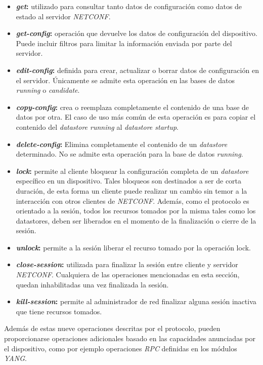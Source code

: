 \begin{itemize}
	\item \textbf{\textit{get}:} utilizado para consultar tanto datos de configuración como datos de estado al servidor \textit{NETCONF}.
	\item \textbf{\textit{get-config}:} operación que devuelve los datos de configuración del dispositivo. Puede incluir filtros para limitar la información enviada por parte del servidor.
	\item \textbf{\textit{edit-config}:} definida para crear, actualizar o borrar datos de configuración en el servidor. Únicamente se admite esta operación en las bases de datos \textit{running} o \textit{candidate}.
	\item \textbf{\textit{copy-config}:} crea o reemplaza completamente el contenido de una base de datos por otra. El caso de uso más común de esta operación es para copiar el contenido del \textit{datastore running} al \textit{datastore startup}. 
	\item \textbf{\textit{delete-config}:} Elimina completamente el contenido de un \textit{datastore} determinado. No se admite esta operación para la base de datos \textit{running}.
	\item \textbf{\textit{lock}:} permite al cliente bloquear la configuración completa de un \textit{datastore} específico en un dispositivo. Tales bloqueos son destinados a ser de corta duración, de esta forma un cliente puede realizar un cambio sin temor a la interacción con otros clientes de \textit{NETCONF}. Además, como el protocolo es orientado a la sesión, todos los recursos tomados por la misma tales como los datastores, deben ser liberados en el momento de la finalización o cierre de la sesión.
	\item \textbf{\textit{unlock}:} permite a la sesión liberar el recurso tomado por la operación lock.
	\item \textbf{\textit{close-session}:} utilizada para finalizar la sesión entre cliente y servidor \textit{NETCONF}. Cualquiera de las operaciones mencionadas en esta sección, quedan inhabilitadas una vez finalizada la sesión.
	\item \textbf{\textit{kill-session}:} permite al administrador de red finalizar alguna sesión inactiva que tiene recursos tomados. 
\end{itemize}

Además de estas nueve operaciones descritas por el protocolo, pueden proporcionarse operaciones adicionales basado en las capacidades anunciadas por el dispositivo, como por ejemplo operaciones \textit{RPC} definidas en los módulos \textit{YANG}.
\\

